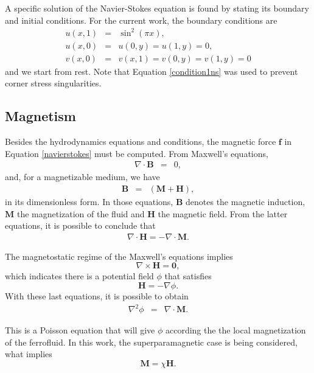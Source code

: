 \documentclass[journal]{IEEEtran}
\begin{document}
A specific solution of the Navier-Stokes equation is found by stating its boundary and initial conditions. For the current work, the boundary conditions are \begin{eqnarray}
u(x,1) & = & \sin^2(\pi x),\label{condition1ns}\\
u(x,0) & = & u(0,y) = u(1,y) = 0,\label{condition2ns}\\
v(x,0) & = & v(x,1) = v(0, y) = v(1, y) = 0\label{condition3ns}
\end{eqnarray} and we start from rest. Note that Equation \ref{condition1ns} was used to prevent corner stress singularities.

\subsection{Magnetism}
Besides the hydrodynamics equations and conditions, the magnetic force $\mathbf{f}$ in Equation \ref{navierstokes} must be computed. From Maxwell's equations, \begin{eqnarray}
\nabla\cdot \mathbf{B} & = & 0\label{secondmagneticequation},
\end{eqnarray} and, for a magnetizable medium, we have \begin{eqnarray}
\mathbf{B} &=& (\mathbf{M}+\mathbf{H}),\label{firstmagneticequation}
\end{eqnarray}
in its dimensionless form. In those equations, $\mathbf{B}$ denotes the magnetic induction, $\mathbf{M}$ the magnetization of the fluid and $\mathbf{H}$ the magnetic field. From the latter equations, it is possible to conclude that \begin{eqnarray}
\nabla\cdot\mathbf{H} = -\nabla\cdot \mathbf{M}\label{mh1}.
\end{eqnarray}

The magnetostatic regime of the Maxwell's equations implies \begin{equation}\nabla\times \mathbf{H} = \mathbf{0},
\end{equation} which indicates there is a potential field $\phi$ that satisfies \begin{equation}\mathbf{H} = -\nabla \phi.\label{Hphipotencial}\end{equation} With these last equations, it is possible to obtain \begin{eqnarray}
\nabla^2\phi &=& \nabla\cdot \mathbf{M}.\label{eqcampomag}
\end{eqnarray}

This is a Poisson equation that will give $\phi$ according the the local magnetization of the ferrofluid. In this work, the superparamagnetic case is being considered, what implies \begin{equation}\mathbf{M} = \chi \mathbf{H}.\end{equation}
\end{document}
